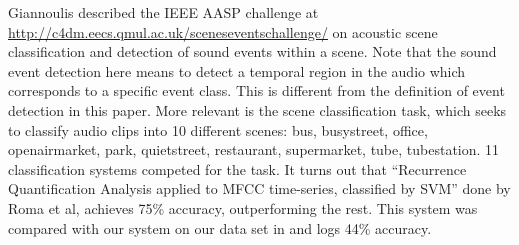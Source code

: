 Giannoulis \et\cite{6701819} described the IEEE AASP challenge at 
\url{http://c4dm.eecs.qmul.ac.uk/sceneseventschallenge/} on acoustic scene 
classification and detection of sound events within a scene.
Note that the sound event detection here means to detect a temporal region
in the audio which corresponds to a specific event class. This is different
from the definition of event detection in this paper. More relevant is the
scene classification task, which seeks to classify audio clips into
10 different scenes: bus, busystreet, office, openairmarket,
park, quietstreet, restaurant, supermarket, tube, tubestation. 11 classification
systems competed for the task. It turns out that ``Recurrence Quantification Analysis applied to MFCC time-series, classified by SVM'' done by Roma et al,
achieves 75\% accuracy, outperforming the rest. This system was
compared with our system on our data set in  and logs
44\% accuracy.
% 
%

